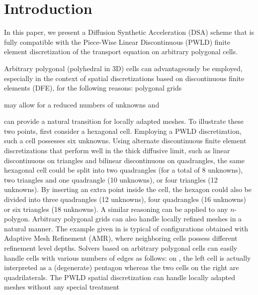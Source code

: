\section{Introduction}

In this paper, we present a Diffusion Synthetic Acceleration (DSA) scheme
that is fully compatible with the Piece-Wise Linear Discontinuous (PWLD) finite
element discretization of the transport equation on arbitrary
polygonal cells. 

Arbitrary polygonal (polyhedral in 3D) cells can advantageously be employed, especially
in the context of spatial discretizations based on discontinuous finite elements (DFE),
for the following reasons: polygonal grids 
\ben
\item may allow for a reduced numbers of unknowns and
\item can provide a natural transition for locally adapted meshes. 
\een
To illustrate these two points, first consider
a hexagonal cell. Employing a PWLD discretization, such a cell possesses six unknowns. Using
alternate discontinuous finite element discretizations that perform well in the thick diffusive limit, such as 
linear discontinuous on triangles and bilinear discontinuous on quadrangles, the same 
hexagonal cell could be split into two quadrangles (for a total of 8 unknowns), two 
triangles and one quadrangle (10 unknowns), or four triangles (12 unknowns). By inserting an 
extra point inside the cell, the hexagon could also be divided into three quadrangles 
(12 unknowns), four quadrangles (16 unknowns) or six triangles (18 unknowns). A 
similar reasoning can be applied to any $n$-polygon. Arbitrary polygonal grids can 
also handle locally refined meshes in a natural manner. The example given
in  is typical of configurations obtained with Adaptive Mesh 
Refinement (AMR), where neighboring cells possess different refinement level depths. 
Solvers based on arbitrary polygonal cells can easily handle cells 
with various numbers of edges as follows: on , the left cell is actually interpreted 
as a (degenerate) pentagon whereas the two cells on the right are quadrilaterals. The PWLD spatial
discretization can handle locally adapted meshes without any special treatment 
